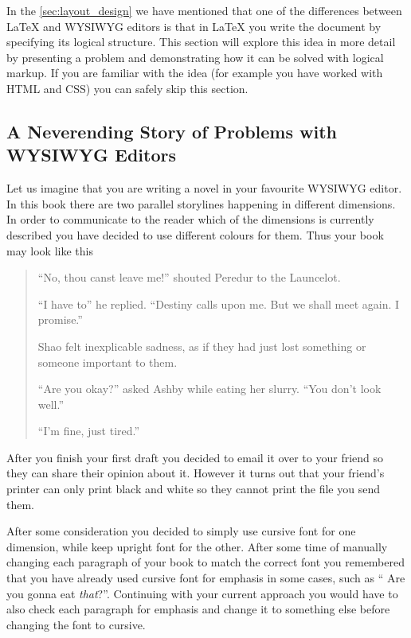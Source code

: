 In the \autoref{sec:layout_design} we have mentioned that one of the
differences between \LaTeX{} and WYSIWYG editors is that in \LaTeX{} you write
the document by specifying its logical structure. This section will explore
this idea in more detail by presenting a problem and demonstrating how it can be
solved with logical markup. If you are familiar with the idea (for example you
have worked with HTML and CSS) you can safely skip this section.

\subsection{A Neverending Story of Problems with WYSIWYG Editors}

Let us imagine that you are writing a novel in your favourite WYSIWYG editor. In
this book there are two parallel storylines happening in different dimensions.
In order to communicate to the reader which of the dimensions is currently
described you have decided to use different colours for them. Thus your book may
look like this
\begin{quotation}
  {\color[HTML]{B71C1C}

    \enquote{No, thou canst leave me!} shouted Peredur to the Launcelot.

    \enquote{I have to} he replied. \enquote{Destiny calls upon me. But we shall
      meet again. I promise.} }

  {\color[HTML]{2E7D32}

    Shao felt inexplicable sadness, as if they had just lost something or
    someone important to them.

    \enquote{Are you okay?} asked Ashby while eating her slurry. \enquote{You
      don't look well.}

    \enquote{I'm fine, just tired.}
  }
\end{quotation}

After you finish your first draft you decided to email it over to your friend
so they can share their opinion about it. However it turns out that your
friend's printer can only print black and white so they cannot print the file
you send them.

After some consideration you decided to simply use cursive font for one
dimension, while keep upright font for the other. After some time of manually
changing each paragraph of your book to match the correct font you remembered
that you have already used cursive font for emphasis in some cases, such as
\enquote{{\color[HTML]{2E7D32} Are you gonna eat \emph{that}?}}. Continuing
with your current approach you would have to also check each paragraph for
emphasis and change it to something else before changing the font to cursive.


